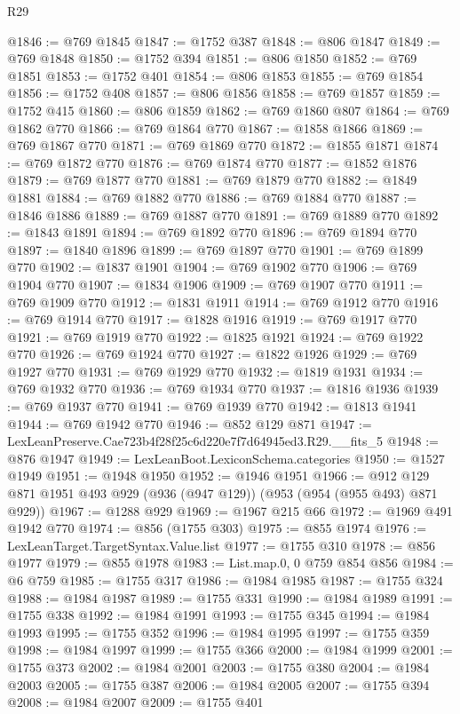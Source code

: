 \begin{lexlean}{R29}
\begin{coremodule}
@1846 := @769 @1845
@1847 := @1752 @387
@1848 := @806 @1847
@1849 := @769 @1848
@1850 := @1752 @394
@1851 := @806 @1850
@1852 := @769 @1851
@1853 := @1752 @401
@1854 := @806 @1853
@1855 := @769 @1854
@1856 := @1752 @408
@1857 := @806 @1856
@1858 := @769 @1857
@1859 := @1752 @415
@1860 := @806 @1859
@1862 := @769 @1860 @807
@1864 := @769 @1862 @770
@1866 := @769 @1864 @770
@1867 := @1858 @1866
@1869 := @769 @1867 @770
@1871 := @769 @1869 @770
@1872 := @1855 @1871
@1874 := @769 @1872 @770
@1876 := @769 @1874 @770
@1877 := @1852 @1876
@1879 := @769 @1877 @770
@1881 := @769 @1879 @770
@1882 := @1849 @1881
@1884 := @769 @1882 @770
@1886 := @769 @1884 @770
@1887 := @1846 @1886
@1889 := @769 @1887 @770
@1891 := @769 @1889 @770
@1892 := @1843 @1891
@1894 := @769 @1892 @770
@1896 := @769 @1894 @770
@1897 := @1840 @1896
@1899 := @769 @1897 @770
@1901 := @769 @1899 @770
@1902 := @1837 @1901
@1904 := @769 @1902 @770
@1906 := @769 @1904 @770
@1907 := @1834 @1906
@1909 := @769 @1907 @770
@1911 := @769 @1909 @770
@1912 := @1831 @1911
@1914 := @769 @1912 @770
@1916 := @769 @1914 @770
@1917 := @1828 @1916
@1919 := @769 @1917 @770
@1921 := @769 @1919 @770
@1922 := @1825 @1921
@1924 := @769 @1922 @770
@1926 := @769 @1924 @770
@1927 := @1822 @1926
@1929 := @769 @1927 @770
@1931 := @769 @1929 @770
@1932 := @1819 @1931
@1934 := @769 @1932 @770
@1936 := @769 @1934 @770
@1937 := @1816 @1936
@1939 := @769 @1937 @770
@1941 := @769 @1939 @770
@1942 := @1813 @1941
@1944 := @769 @1942 @770
@1946 := @852 @129 @871
@1947 := LexLeanPreserve.Cae723b4f28f25c6d220e7f7d64945ed3.R29.__fits_5
@1948 := @876 @1947
@1949 := LexLeanBoot.LexiconSchema.categories
@1950 := @1527 @1949
@1951 := @1948 @1950
@1952 := @1946 @1951
@1966 := @912 @129 @871 @1951 @493 @929 (@936 (@947 @129)) (@953 (@954 (@955 @493) @871 @929))
@1967 := @1288 @929
@1969 := @1967 @215 @66
@1972 := @1969 @491 @1942 @770
@1974 := @856 (@1755 @303)
@1975 := @855 @1974
@1976 := LexLeanTarget.TargetSyntax.Value.list
@1977 := @1755 @310
@1978 := @856 @1977
@1979 := @855 @1978
@1983 := List.map.{0, 0} @759 @854 @856
@1984 := @6 @759
@1985 := @1755 @317
@1986 := @1984 @1985
@1987 := @1755 @324
@1988 := @1984 @1987
@1989 := @1755 @331
@1990 := @1984 @1989
@1991 := @1755 @338
@1992 := @1984 @1991
@1993 := @1755 @345
@1994 := @1984 @1993
@1995 := @1755 @352
@1996 := @1984 @1995
@1997 := @1755 @359
@1998 := @1984 @1997
@1999 := @1755 @366
@2000 := @1984 @1999
@2001 := @1755 @373
@2002 := @1984 @2001
@2003 := @1755 @380
@2004 := @1984 @2003
@2005 := @1755 @387
@2006 := @1984 @2005
@2007 := @1755 @394
@2008 := @1984 @2007
@2009 := @1755 @401

\end{coremodule}
\end{lexlean}
